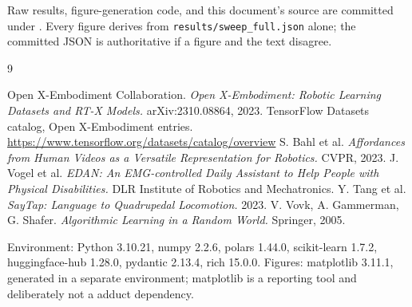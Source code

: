 \documentclass[10pt,a4paper]{article}
\newcommand{\dtr}[1]{\texttt{\small #1}}
\begin{document}
Raw results, figure-generation code, and this document's source are committed under
. Every figure derives from
\dtr{results/sweep\_full.json} alone; the committed JSON is authoritative if a figure and
the text disagree.

\begin{thebibliography}{9}
\raggedright
{} Open X-Embodiment Collaboration. \emph{Open X-Embodiment: Robotic Learning
Datasets and RT-X Models.} arXiv:2310.08864, 2023.
 TensorFlow Datasets catalog, Open X-Embodiment entries.
\url{https://www.tensorflow.org/datasets/catalog/overview}
 S. Bahl et al. \emph{Affordances from Human Videos as a Versatile
Representation for Robotics.} CVPR, 2023.
 J. Vogel et al. \emph{EDAN: An EMG-controlled Daily Assistant to Help People
with Physical Disabilities.} DLR Institute of Robotics and Mechatronics.
 Y. Tang et al. \emph{SayTap: Language to Quadrupedal Locomotion.} 2023.
 V. Vovk, A. Gammerman, G. Shafer. \emph{Algorithmic Learning in a Random
World.} Springer, 2005.
\end{thebibliography}

\vspace{0.4em}
\noindent\textcolor{ink}{\footnotesize Environment: Python 3.10.21, numpy 2.2.6,
polars 1.44.0, scikit-learn 1.7.2, huggingface-hub 1.28.0, pydantic 2.13.4, rich 15.0.0.
Figures: matplotlib 3.11.1, generated in a separate environment; matplotlib is a reporting
tool and deliberately not a adduct dependency.}
\end{document}
